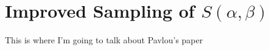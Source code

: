 \documentclass[../master.tex]{subfiles}
\begin{document}
\chapter{Improved Sampling of $S(\alpha,\beta)$}

This is where I'm going to talk about Pavlou's paper
\end{document}
